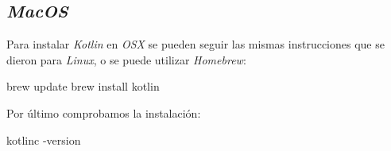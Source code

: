 \subsection{\textit{MacOS}}
  Para instalar \textit{Kotlin} en \textit{OSX} se pueden seguir las mismas instrucciones que se
  dieron para \textit{Linux}, o se puede utilizar \textit{Homebrew}:

  \begin{bash}
    brew update
    brew install kotlin
  \end{bash}

  Por último comprobamos la instalación:

  \begin{bash}
    kotlinc -version
  \end{bash}